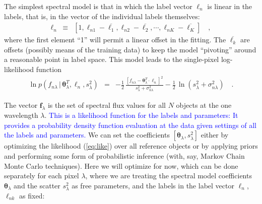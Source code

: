 \documentclass[12pt, preprint]{aastex}
\newcommand{\set}[1]{\bm{#1}}
\newcommand{\starlabel}{\ell}
\newcommand{\starlabelvec}{\set{\starlabel}}
\newcommand{\mean}[1]{\overline{#1}}
\newcommand{\given}{\,|\,}
\begin{document}
The simplest spectral model is that in which the label vector $\starlabelvec_n$ is
linear in the labels, that is, in the vector of the individual labels themselves:
\begin{eqnarray}
\starlabelvec_n &\equiv& [1,
                           \starlabel_{n1} - \mean{\starlabel_1},
                           \starlabel_{n2} - \mean{\starlabel_2},
                           \cdots,
                           \starlabel_{nK} - \mean{\starlabel_K}]
\label{eq:linear}\quad,
\end{eqnarray}
where the first element ``1'' will permit a linear offset in the fitting.
The $\mean{\starlabel_k}$ are offsets (possibly means of the training data) to
keep the model ``pivoting'' around a reasonable point in label space.
This model leads to the single-pixel log-likelihood function 
\begin{eqnarray}
\ln p(f_{n\lambda}\given\set{\theta}^T_\lambda, \starlabelvec_n, s_\lambda^2) &=&
 -\frac{1}{2}\,\frac{[f_{n\lambda} - \set{\theta}^T_\lambda \cdot \starlabelvec_n]^2}{s_\lambda^2 + \sigma_{n\lambda}^2}
 -\frac{1}{2}\,\ln(s_\lambda^2 + \sigma_{n\lambda}^2)
\label{eq:like}\quad.
\end{eqnarray}

The vector $\set{f}_\lambda$ is the set of spectral flux values for
all $N$ objects at the one wavelength $\lambda$. \textcolor{blue}{This is a likelihood function for the labels and parameters:  It provides a probability density function evaluation at the data given settings of all the labels and parameters.}
We can set the coefficients $[\set{\theta}_\lambda,s_\lambda^2]$ either by
optimizing the likelihood (\ref{eq:like}) over all reference objects or by applying priors and
performing some form of probabilistic inference (with, say, Markov
Chain Monte Carlo techniques).
Here we will optimize for now, which can be done separately for each pixel $\lambda$, where
we are treating the spectral model coefficients $\set{\theta}_\lambda$ and the scatter $s_\lambda^2$ as free parameters, and the
labels in the label vector $\starlabelvec_n$, $\starlabel_{nk}$ as fixed:
\end{document}
